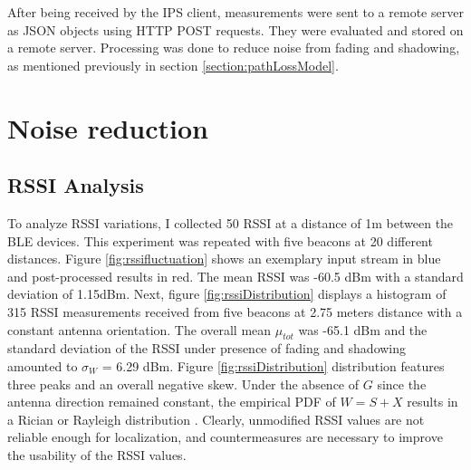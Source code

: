 \documentclass[a4paper, oneside]{ipsreport}
\begin{document}
After being received by the IPS client, measurements were sent to a remote server as JSON objects using HTTP POST requests. They were evaluated and stored on a remote server. Processing was done to reduce noise from fading and shadowing, as mentioned previously in section \ref{section:pathLossModel}.

\section{Noise reduction}
\subsection{RSSI Analysis}
To analyze RSSI variations, I collected 50 RSSI at a distance of 1m between the BLE devices. This experiment was repeated with five beacons at 20 different distances. Figure \ref{fig:rssifluctuation} shows an exemplary input stream in blue and post-processed results in red. The mean RSSI was -60.5 dBm with a standard deviation of 1.15dBm. Next, figure \ref{fig:rssiDistribution} displays a histogram of 315 RSSI measurements received from five beacons at 2.75 meters distance with a constant antenna orientation. The overall mean $\mu_{tot}$ was -65.1 dBm and the standard deviation of the RSSI under presence of fading and shadowing amounted to $\sigma_{W}$ = 6.29 dBm. Figure \ref{fig:rssiDistribution} distribution features three peaks and an overall negative skew. Under the absence of $G$ since the antenna direction remained constant, the empirical PDF of $W = S + X$ results in a Rician or Rayleigh distribution \cite{AdvertisingInterval}. Clearly, unmodified RSSI values are not reliable enough for localization, and countermeasures are necessary to improve the usability of the RSSI values.
\end{document}
